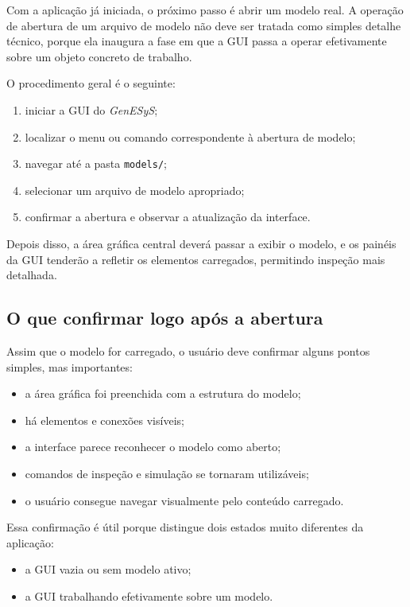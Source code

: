 Com a aplicação já iniciada, o próximo passo é abrir um modelo real. A operação de abertura de um arquivo de modelo não deve ser tratada como simples detalhe técnico, porque ela inaugura a fase em que a GUI passa a operar efetivamente sobre um objeto concreto de trabalho.

O procedimento geral é o seguinte:
\begin{enumerate}
    \item iniciar a GUI do \textit{GenESyS};
    \item localizar o menu ou comando correspondente à abertura de modelo;
    \item navegar até a pasta \texttt{models/};
    \item selecionar um arquivo de modelo apropriado;
    \item confirmar a abertura e observar a atualização da interface.
\end{enumerate}

Depois disso, a área gráfica central deverá passar a exibir o modelo, e os painéis da GUI tenderão a refletir os elementos carregados, permitindo inspeção mais detalhada.

\subsection{O que confirmar logo após a abertura}
\label{subsec:cap4_confirmar_apos_abertura}

Assim que o modelo for carregado, o usuário deve confirmar alguns pontos simples, mas importantes:

\begin{itemize}
    \item a área gráfica foi preenchida com a estrutura do modelo;
    \item há elementos e conexões visíveis;
    \item a interface parece reconhecer o modelo como aberto;
    \item comandos de inspeção e simulação se tornaram utilizáveis;
    \item o usuário consegue navegar visualmente pelo conteúdo carregado.
\end{itemize}

Essa confirmação é útil porque distingue dois estados muito diferentes da aplicação:
\begin{itemize}
    \item a GUI vazia ou sem modelo ativo;
    \item a GUI trabalhando efetivamente sobre um modelo.
\end{itemize}

